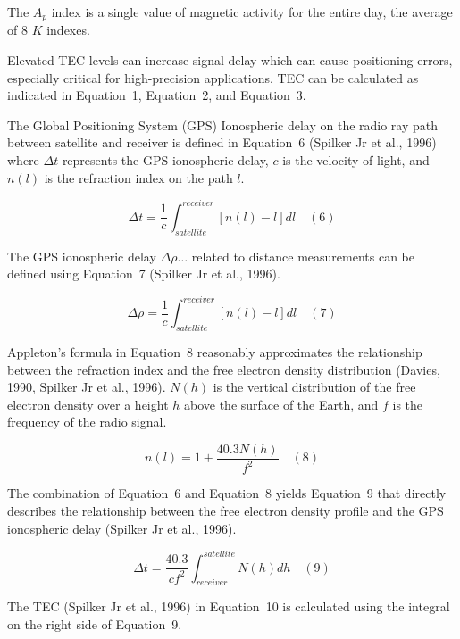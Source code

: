 \documentclass[sn-mathphys-num]{sn-jnl}%
\begin{document}
The $A_p$ index is a single value of magnetic activity for the entire day, the average of $8$ $K$ indexes. 
 
Elevated TEC levels can increase signal delay which can cause positioning errors, especially critical for high-precision applications. TEC can be calculated as indicated in Equation~1, Equation~2, and Equation~3. 

The Global Positioning System (GPS) Ionospheric delay on the radio ray path between satellite and receiver is defined in Equation~6 (Spilker Jr et al., 1996) where $\Delta t$ represents the GPS ionospheric delay, $c$ is the velocity of light, and $n(l)$ is the refraction index on the path $l$.

\begin{equation}
	\Delta t = \frac{1}{c} \int_{satellite}^{receiver} \left[ n(l) - l \right]dl
	\quad\left(6\right)
\end{equation}

The GPS ionospheric delay $\Delta \rho \dots$ related to distance measurements can be defined using Equation~7 (Spilker Jr et al., 1996).

\begin{equation}
	\Delta \rho = \frac{1}{c} \int_{satellite}^{receiver} \left[ n(l) - l \right]dl
	\quad\left(7\right)
\end{equation}

Appleton’s formula in Equation~8 reasonably approximates the relationship between the refraction index and the free electron density distribution (Davies, 1990, Spilker Jr et al., 1996). $N(h)$ is the vertical distribution of the free electron density over a height $h$ above the surface of the Earth, and $f$ is the frequency of the radio signal.

\begin{equation}
	n(l) = 1 + \frac{40.3 N(h)}{f^{2}}
	\quad\left(8\right)
\end{equation}

The combination of Equation~6 and Equation~8 yields Equation~9 that directly describes the relationship between the free electron density profile and the GPS ionospheric delay (Spilker Jr et al., 1996).

\begin{equation}
	\Delta t = \frac{40.3}{c f^{2}} \int_{receiver}^{satellite} N(h)dh
	\quad\left(9\right)
\end{equation}

The TEC (Spilker Jr et al., 1996) in Equation~10 is calculated using the integral on the right side of Equation~9.
\end{document}
